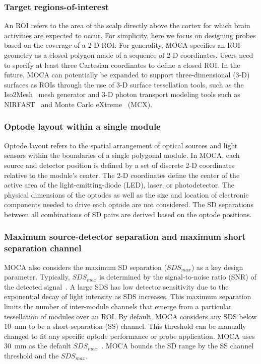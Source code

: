 \subsubsection{Target regions-of-interest}
An ROI refers to the area of the scalp directly above the cortex for which brain activities are expected to occur\cite{Hiroyasu2015}. For simplicity, here we focus on designing probes based on the coverage of a 2-D ROI. For generality, MOCA specifies an ROI geometry as a closed polygon made of a sequence of 2-D coordinates. Users need to specify at least three Cartesian coordinates to define a closed ROI. In the future, MOCA can potentially be expanded to support three-dimensional (3-D) surfaces as ROIs through the use of 3-D surface tessellation tools, such as the Iso2Mesh~\cite{Fang2009a} mesh generator and 3-D photon transport modeling tools such as NIRFAST~\cite{Nirfast} and Monte Carlo eXtreme~\cite{Fang2009} (MCX).

\subsubsection{Optode layout within a single module}
Optode layout refers to the spatial arrangement of optical sources and light sensors within the boundaries of a single polygonal module. In MOCA, each source and detector position is defined by a set of discrete 2-D coordinates relative to the module's center. The 2-D coordinates define the center of the active area of the light-emitting-diode (LED), laser, or photodetector. The physical dimensions of the optodes as well as the size and location of electronic components needed to drive each optode are not considered. The SD separations between all combinations of SD pairs are derived based on the optode positions.

\subsubsection{Maximum source-detector separation and maximum short separation channel}
MOCA also considers the maximum SD separation ($SDS_{max}$) as a key design parameter. Typically, $SDS_{max}$ is determined by the signal-to-noise ratio (SNR) of the detected signal~\cite{Arnulphi2009}. A large SDS has low detector sensitivity due to the exponential decay of light intensity as SDS increases. This maximum separation limits the number of inter-module channels that emerge from a particular tessellation of modules over an ROI. By default, MOCA considers any SDS below 10~mm to be a short-separation (SS) channel. This threshold can be manually changed to fit any specific optode performance or probe application. MOCA uses 30~mm as the default $SDS_{max}$~\cite{Taga2007, LloydFox2010}. MOCA bounds the SD range by the SS channel threshold and the $SDS_{max}$. 

